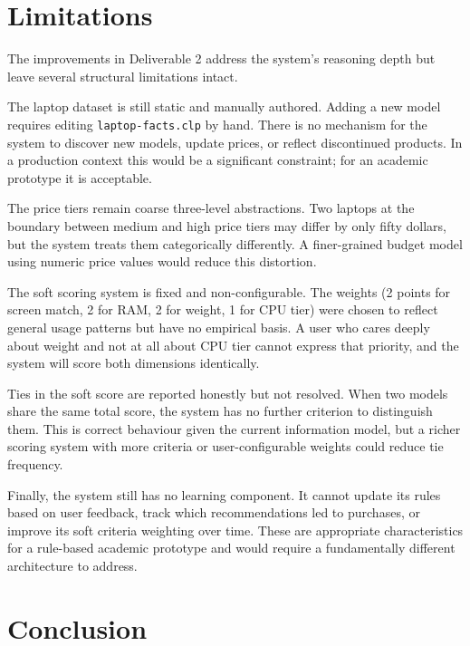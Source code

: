 \documentclass[12pt,a4paper]{article}
\begin{document}
\section{Limitations}
\label{sec:limitations-d2}

The improvements in Deliverable 2 address the system's reasoning depth but leave several structural limitations intact.

The laptop dataset is still static and manually authored. Adding a new model requires editing \texttt{laptop-facts.clp} by hand. There is no mechanism for the system to discover new models, update prices, or reflect discontinued products. In a production context this would be a significant constraint; for an academic prototype it is acceptable.

The price tiers remain coarse three-level abstractions. Two laptops at the boundary between medium and high price tiers may differ by only fifty dollars, but the system treats them categorically differently. A finer-grained budget model using numeric price values would reduce this distortion.

The soft scoring system is fixed and non-configurable. The weights (2 points for screen match, 2 for RAM, 2 for weight, 1 for CPU tier) were chosen to reflect general usage patterns but have no empirical basis. A user who cares deeply about weight and not at all about CPU tier cannot express that priority, and the system will score both dimensions identically.

Ties in the soft score are reported honestly but not resolved. When two models share the same total score, the system has no further criterion to distinguish them. This is correct behaviour given the current information model, but a richer scoring system with more criteria or user-configurable weights could reduce tie frequency.

Finally, the system still has no learning component. It cannot update its rules based on user feedback, track which recommendations led to purchases, or improve its soft criteria weighting over time. These are appropriate characteristics for a rule-based academic prototype and would require a fundamentally different architecture to address.

\section{Conclusion}
\end{document}
